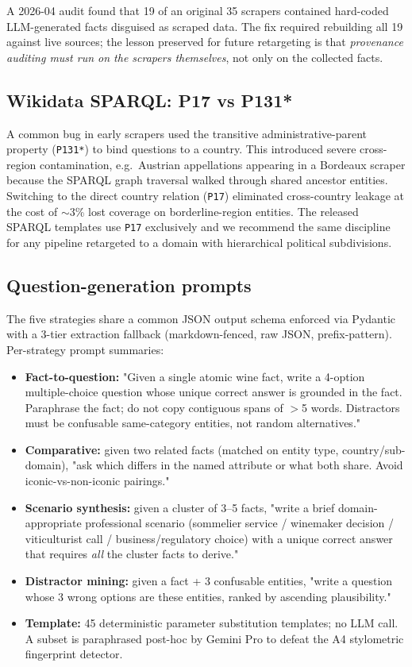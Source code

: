 A 2026-04 audit found that 19 of an original 35 scrapers contained
hard-coded LLM-generated facts disguised as scraped data. The fix
required rebuilding all 19 against live sources; the lesson preserved
for future retargeting is that \emph{provenance auditing must run on
the scrapers themselves}, not only on the collected facts.

\subsection{Wikidata SPARQL: P17 vs P131*}
A common bug in early scrapers used the transitive administrative-parent
property (\texttt{P131*}) to bind questions to a country. This introduced
severe cross-region contamination, e.g.\ Austrian appellations appearing
in a Bordeaux scraper because the SPARQL graph traversal walked through
shared ancestor entities. Switching to the direct country relation
(\texttt{P17}) eliminated cross-country leakage at the cost of
$\sim$3\% lost coverage on borderline-region entities. The released
SPARQL templates use \texttt{P17} exclusively and we recommend the same
discipline for any pipeline retargeted to a domain with hierarchical
political subdivisions.

\subsection{Question-generation prompts}
The five strategies share a common JSON output schema enforced via
Pydantic with a 3-tier extraction fallback (markdown-fenced, raw JSON,
prefix-pattern). Per-strategy prompt summaries:

\begin{itemize}\itemsep -1pt
  \item \textbf{Fact-to-question:} "Given a single atomic wine fact,
    write a 4-option multiple-choice question whose unique correct
    answer is grounded in the fact. Paraphrase the fact; do not copy
    contiguous spans of $>$5 words. Distractors must be confusable
    same-category entities, not random alternatives."
  \item \textbf{Comparative:} given two related facts (matched on
    entity type, country/sub-domain), "ask which differs in the named
    attribute or what both share. Avoid iconic-vs-non-iconic pairings."
  \item \textbf{Scenario synthesis:} given a cluster of 3--5 facts,
    "write a brief domain-appropriate professional scenario (sommelier
    service / winemaker decision / viticulturist call /
    business/regulatory choice) with a unique correct answer that
    requires \emph{all} the cluster facts to derive."
  \item \textbf{Distractor mining:} given a fact + 3 confusable
    entities, "write a question whose 3 wrong options are these
    entities, ranked by ascending plausibility."
  \item \textbf{Template:} 45 deterministic parameter substitution
    templates; no LLM call. A subset is paraphrased post-hoc by Gemini
    Pro to defeat the A4 stylometric fingerprint detector.
\end{itemize}

